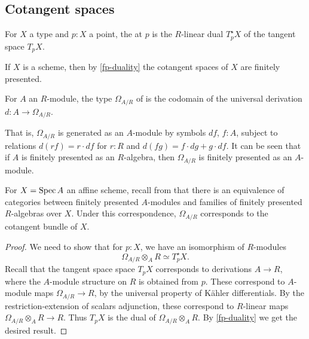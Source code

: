 \subsection{Cotangent spaces}

\begin{definition}
For $X$ a type and $p : X$ a point, the  at $p$ is the
$R$-linear dual $T^\star_p X$ of the tangent space $T_p X$.
\end{definition}

If $X$ is a scheme, then by \cref{fp-duality} the cotangent spaces of $X$
are finitely presented.

\begin{definition}
For $A$ an $R$-module, the type $\Omega_{A/R}$ of 
is the codomain of the universal derivation $d : A \to \Omega_{A/R}$.
\end{definition}
That is, $\Omega_{A/R}$ is generated as an $A$-module by symbols
$df$, $f : A$, subject to relations $d(rf) = r \cdot df$ for $r : R$ and
$d(fg) = f \cdot dg + g \cdot df$.
It can be seen that if $A$ is finitely presented as an $R$-algebra,
then $\Omega_{A/R}$ is finitely presented as an $A$-module.

\begin{lemma}
For $X = \operatorname{Spec} A$ an affine scheme, recall from
\cite[Theorem 8.2.3]{draft} that there is an equivalence of categories between
finitely presented $A$-modules and families of finitely presented $R$-algebras
over $X$. Under this correspondence,
$\Omega_{A/R}$ corresponds to the cotangent bundle of $X$.
\end{lemma}
\begin{proof}
We need to show that for $p : X$,
   we have an isomorphism of $R$-modules
   \[\Omega_{A/R} \otimes_A R \simeq T^\star_p X.\]
Recall that the tangent space space $T_p X$ corresponds to derivations
$A \to R$, where the $A$-module structure on $R$ is obtained from $p$.
These correspond to $A$-module maps $\Omega_{A/R} \to R$, by the universal property
of Kähler differentials.
By the restriction-extension of scalars adjunction, these correspond to $R$-linear
maps $\Omega_{A/R} \otimes_A R \to R$.
Thus $T_p X$ is the dual of
$\Omega_{A/R} \otimes_A R$.
By \cref{fp-duality} we get the desired result.
\end{proof}
